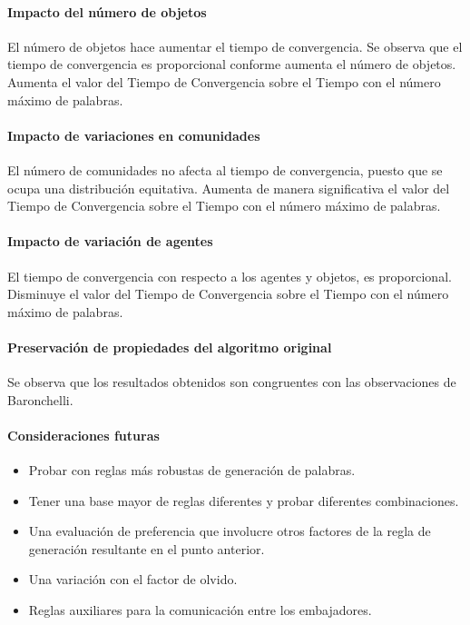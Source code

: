 \documentclass[runningheads]{llncs}
\begin{document}
\paragraph{Impacto del número  de objetos}
El número de objetos hace aumentar el tiempo de convergencia. Se observa que el tiempo de convergencia es proporcional conforme aumenta el número de objetos. Aumenta el valor del Tiempo de Convergencia sobre el Tiempo con el número máximo de palabras.
\paragraph{Impacto de variaciones en comunidades}
El número de comunidades no afecta al tiempo de convergencia, puesto que se ocupa una distribución equitativa. Aumenta de manera significativa el valor del Tiempo de Convergencia sobre el Tiempo con el número máximo de palabras.
\paragraph{Impacto de variación de agentes}
El tiempo de convergencia con respecto a los agentes y objetos, es proporcional. Disminuye el valor del Tiempo de Convergencia sobre el Tiempo con el número máximo de palabras.
\paragraph{Preservación de propiedades del algoritmo original}
Se observa que los resultados obtenidos son congruentes con las observaciones de Baronchelli.
\paragraph{Consideraciones futuras}
\begin{itemize}
	\item Probar con reglas más robustas de generación de palabras.
	\item Tener una base mayor de reglas diferentes y probar diferentes combinaciones.
	\item Una evaluación de preferencia que involucre otros factores de la regla de generación resultante en el punto anterior.
	\item Una variación con el factor de olvido.
	\item Reglas auxiliares para la comunicación entre los embajadores.
\end{itemize}
%
%
%
% 
% 
%

\end{document}
